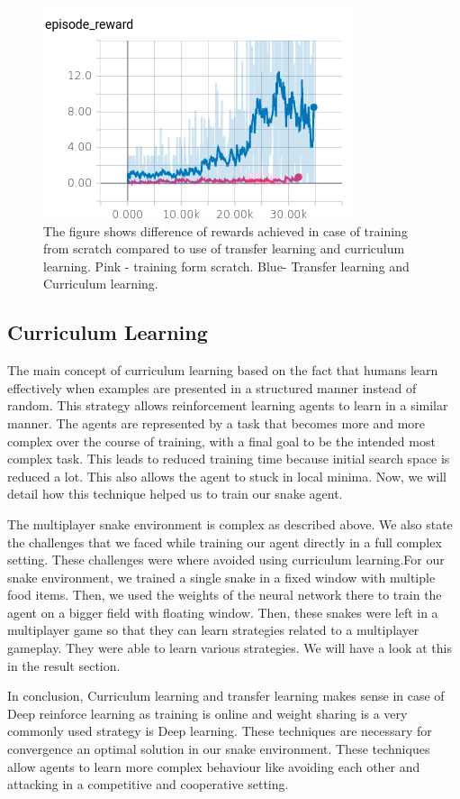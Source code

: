 \documentclass[conference,10pt]{IEEEtran}
\begin{document}
	\begin{figure}
	  \centering
	  \includegraphics[scale=1.5]{tflearbing.png}
	  \caption{The figure shows difference of rewards achieved in case of training from scratch compared to use of transfer learning and curriculum learning. Pink - training form scratch. Blue- Transfer learning and Curriculum learning. }
	\end{figure}

	\subsection{Curriculum Learning}
	The main concept of curriculum learning based on the fact that humans learn effectively when examples are presented in a structured manner instead of random. This strategy allows reinforcement learning agents to learn in a similar manner. The agents are represented by a task that becomes more and more complex over the course of training, with a final goal to be the intended most complex task. This leads to reduced training time because initial search space is reduced a lot. This also allows the agent to stuck in local minima. Now, we will detail how this technique helped us to train our snake agent.

	The multiplayer snake environment is complex as described above. We also state the challenges that we faced while training our agent directly in a full complex setting. These challenges were where avoided using curriculum learning.For our snake environment, we trained a single snake in a fixed window with multiple food items. Then, we used the weights of the neural network there to train the agent on a bigger field with floating window. Then, these snakes were left in a multiplayer game so that they can learn strategies related to a multiplayer gameplay. They were able to learn various strategies. We will have a look at this in the result section.


	In conclusion, Curriculum learning and transfer learning makes sense in case of Deep reinforce learning as training is online and weight sharing is a very commonly used strategy is Deep learning. These techniques are necessary for convergence an optimal solution in our snake environment. These techniques allow agents to learn more complex behaviour like avoiding each other and attacking in a competitive and cooperative setting.
\end{document}
